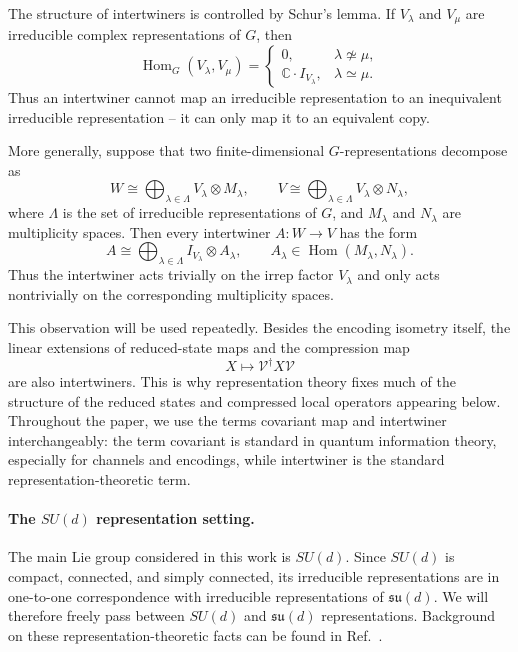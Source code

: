 \documentclass[10pt,twocolumn,superscriptaddress,aps,amsmath,amssymb,citeautoscript,floatfix,prx]{revtex4-2}
\theoremstyle{plain}
\theoremstyle{plain}
\theoremstyle{plain}
\theoremstyle{plain}
\theoremstyle{plain}
\theoremstyle{plain}
\theoremstyle{plain}
\theoremstyle{definition}
\theoremstyle{plain}
\begin{document}
The structure of intertwiners is controlled by Schur's lemma. If $V_\lambda$ and $V_\mu$ are irreducible complex representations of $G$, then
$$
\operatorname{Hom}_G(V_\lambda,V_\mu)
=
\begin{cases}
0, & \lambda\not\simeq\mu,\\
\mathbb C\cdot I_{V_\lambda}, & \lambda\simeq\mu .
\end{cases}
$$
Thus an intertwiner cannot map an irreducible representation to an inequivalent irreducible representation -- it can only map it to an equivalent copy.

More generally, suppose that two finite-dimensional $G$-representations decompose as
$$
W
\cong
\bigoplus_{\lambda\in\Lambda}
V_\lambda\otimes M_\lambda,
\qquad
V
\cong
\bigoplus_{\lambda\in\Lambda}
V_\lambda\otimes N_\lambda,
$$
where $\Lambda$ is the set of irreducible representations of $G$, and $M_\lambda$ and $N_\lambda$ are multiplicity spaces. Then every intertwiner $A:W\to V$ has the form
\begin{equation}\label{eq:intertwiner_decomp}
A
\cong
\bigoplus_{\lambda\in\Lambda}
I_{V_\lambda}\otimes A_\lambda,
\qquad
A_\lambda\in\operatorname{Hom}(M_\lambda,N_\lambda).
\end{equation}
Thus the intertwiner acts trivially on the irrep factor $V_\lambda$ and only acts nontrivially on the corresponding multiplicity spaces.

This observation will be used repeatedly. Besides the encoding isometry itself, the linear extensions of reduced-state maps and the compression map
$$
X
\longmapsto
\mathcal{V}^\dagger X \mathcal{V}
$$
are also intertwiners. This is why representation theory fixes much of the structure of the reduced states and compressed local operators appearing below. 
Throughout the paper, we use the terms covariant map and intertwiner interchangeably: the term covariant is standard in quantum information theory, 
especially for channels and encodings, while intertwiner is the standard representation-theoretic term.

\paragraph{The $SU(d)$ representation setting.}

The main Lie group considered in this work is $SU(d)$. Since $SU(d)$ is compact, connected, and simply connected, 
its irreducible representations are in one-to-one correspondence with irreducible representations of $\mathfrak{su}(d)$. 
We will therefore freely pass between $SU(d)$ and $\mathfrak{su}(d)$ representations. 
Background on these representation-theoretic facts can be found in Ref.~\cite{Hall2015}.
\end{document}
